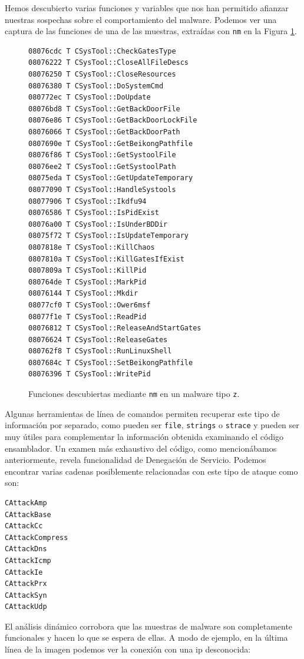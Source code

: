 \documentclass[journal]{IEEEtran}
\begin{document}
Hemos descubierto varias funciones y variables que nos han permitido afianzar nuestras sospechas sobre el comportamiento del malware. Podemos ver una captura de las funciones de una de las muestras, extraídas con {\tt nm} en la Figura \ref{fig:nm}.

\begin{figure}
\begin{lstlisting}[basicstyle=\small\ttfamily]
08076cdc T CSysTool::CheckGatesType
08076222 T CSysTool::CloseAllFileDescs
08076250 T CSysTool::CloseResources
08076380 T CSysTool::DoSystemCmd
080772ec T CSysTool::DoUpdate
08076bd8 T CSysTool::GetBackDoorFile
08076e86 T CSysTool::GetBackDoorLockFile
08076066 T CSysTool::GetBackDoorPath
0807690e T CSysTool::GetBeikongPathfile
08076f86 T CSysTool::GetSystoolFile
08076ee2 T CSysTool::GetSystoolPath
08075eda T CSysTool::GetUpdateTemporary
08077090 T CSysTool::HandleSystools
08077906 T CSysTool::Ikdfu94
08076586 T CSysTool::IsPidExist
08076a00 T CSysTool::IsUnderBDDir
08075f72 T CSysTool::IsUpdateTemporary
0807818e T CSysTool::KillChaos
0807810a T CSysTool::KillGatesIfExist
0807809a T CSysTool::KillPid
080764de T CSysTool::MarkPid
08076144 T CSysTool::Mkdir
08077cf0 T CSysTool::Ower6msf
08077f1e T CSysTool::ReadPid
08076812 T CSysTool::ReleaseAndStartGates
08076624 T CSysTool::ReleaseGates
080762f8 T CSysTool::RunLinuxShell
0807684c T CSysTool::SetBeikongPathfile
08076396 T CSysTool::WritePid
\end{lstlisting}
\caption{Funciones descubiertas mediante {\tt nm} en un malware tipo {\tt z}.}
\label{fig:nm}
\end{figure}

Algunas herramientas de línea de comandos permiten recuperar este tipo de información por separado, como pueden ser {\tt file}, {\tt strings} o {\tt strace} y pueden ser muy útiles para complementar la información obtenida examinando el código ensamblador. Un examen más exhaustivo del código, como mencionábamos anteriormente, revela funcionalidad de Denegación de Servicio. Podemos encontrar varias cadenas posiblemente relacionadas con este tipo de ataque como son:

\begin{lstlisting}[basicstyle=\small\ttfamily]
CAttackAmp
CAttackBase
CAttackCc
CAttackCompress
CAttackDns
CAttackIcmp
CAttackIe
CAttackPrx
CAttackSyn
CAttackUdp
\end{lstlisting}

El análisis dinámico corrobora que las muestras de malware son completamente funcionales y hacen lo que se espera de ellas. A modo de ejemplo, en la última línea de la imagen podemos ver la conexión con una ip desconocida:
\end{document}
